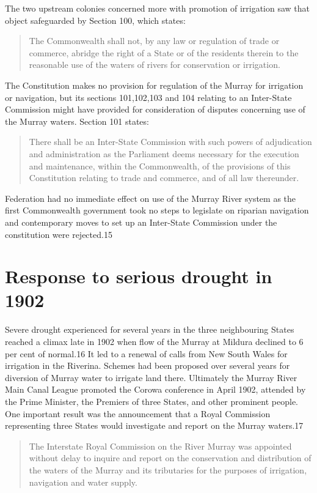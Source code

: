 The two upstream colonies concerned more with promotion of irrigation
saw that object safeguarded by Section 100, which states:
\begin{quote}
	The Commonwealth shall not, by any law or regulation of trade
	or commerce, abridge the right of a State or of the residents
	therein to the reasonable use of the waters of rivers for
	conservation or irrigation.
\end{quote}

The Constitution makes no provision for regulation of the Murray for
irrigation or navigation, but its sections 101,102,103 and 104
relating to an Inter-State Commission might have provided for
consideration of disputes concerning use of the Murray waters.
Section 101 states:
\begin{quote}
	There shall be an Inter-State Commission with such powers of
	adjudication and administration as the Parliament deems
	necessary for the execution and maintenance, within the
	Commonwealth, of the provisions of this Constitution relating
	to trade and commerce, and of all law thereunder.
\end{quote}
Federation had no immediate effect on use of the Murray River system
as the first Commonwealth government took no steps to legislate on
riparian navigation and contemporary moves to set up an Inter-State
Commission under the constitution were rejected.15

\section{Response to serious drought in 1902}

Severe drought experienced for several years in the three neighbouring
States reached a climax late in 1902 when flow of the Murray at
Mildura declined to 6 per cent of normal.16 It led to a renewal of
calls from New South Wales for irrigation in the Riverina.  Schemes
had been proposed over several years for diversion of Murray water to
irrigate land there.  Ultimately the Murray River Main Canal League
promoted the Corowa conference in April 1902, attended by the Prime
Minister, the Premiers of three States, and other prominent people.
One important result was the announcement that a Royal Commission
representing three States would investigate and report on the Murray
waters.17
\begin{quote}
	The Interstate Royal Commission on the River Murray was
	appointed without delay to inquire and report on the
	conservation and distribution of the waters of the Murray and
	its tributaries for the purposes of irrigation, navigation and
	water supply.
\end{quote}

